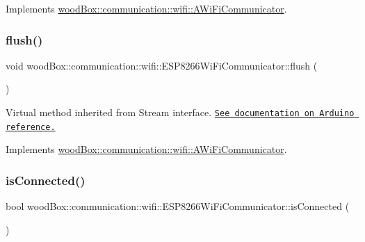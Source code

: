 Implements \mbox{\hyperlink{classwood_box_1_1communication_1_1wifi_1_1_a_wi_fi_communicator_aeb87d8a22ad08c929c28191a4c725a5b}{wood\+Box\+::communication\+::wifi\+::\+A\+Wi\+Fi\+Communicator}}.

\mbox{\label{classwood_box_1_1communication_1_1wifi_1_1_e_s_p8266_wi_fi_communicator_a523aec958ef48fa917621a560d964f40}} 
\subsubsection{\texorpdfstring{flush()}{flush()}}
{\footnotesize\ttfamily void wood\+Box\+::communication\+::wifi\+::\+E\+S\+P8266\+Wi\+Fi\+Communicator\+::flush (\begin{DoxyParamCaption}{ }\end{DoxyParamCaption})\hspace{0.3cm}{\ttfamily [virtual]}}

Virtual method inherited from Stream interface. \href{https://www.arduino.cc/reference/en/language/functions/communication/stream/streamflush/}{\tt See documentation on Arduino reference.} 

Implements \mbox{\hyperlink{classwood_box_1_1communication_1_1wifi_1_1_a_wi_fi_communicator_a1c74b8bc27a89604b4b7daa94c0168a6}{wood\+Box\+::communication\+::wifi\+::\+A\+Wi\+Fi\+Communicator}}.

\mbox{\label{classwood_box_1_1communication_1_1wifi_1_1_e_s_p8266_wi_fi_communicator_a66b7f8adaae85dbf94062b1cd472d98a}} 
\subsubsection{\texorpdfstring{is\+Connected()}{isConnected()}}
{\footnotesize\ttfamily bool wood\+Box\+::communication\+::wifi\+::\+E\+S\+P8266\+Wi\+Fi\+Communicator\+::is\+Connected (\begin{DoxyParamCaption}{ }\end{DoxyParamCaption})\hspace{0.3cm}{\ttfamily [virtual]}}

